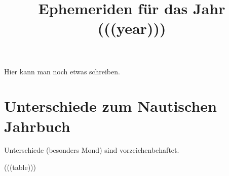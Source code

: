 \documentclass[a4paper, twoside]{book}
\title{Ephemeriden für das Jahr (((year)))}
\begin{document}
\sffamily
\maketitle
Hier kann man noch etwas schreiben.


\newpage

\section{Unterschiede zum Nautischen Jahrbuch}
Unterschiede (besonders Mond) sind vorzeichenbehaftet.

\newpage

(((table)))
\end{document}
